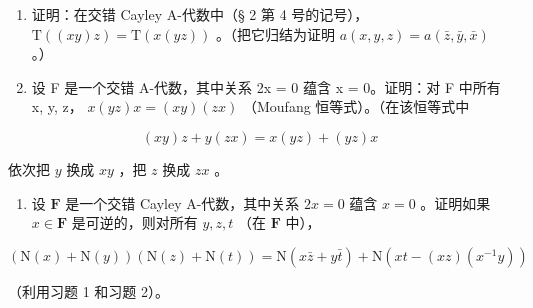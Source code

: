 \BourbakiAppendixExercises

\begin{enumerate}
\def\labelenumi{\arabic{enumi}.}
\item
  证明：在交错 Cayley A-代数中（§ 2 第 4 号的记号）， \(\mathrm{T}((xy)z) = \mathrm{T}(x(yz))\) 。（把它归结为证明 \(a(x,y,z) = a(\bar{z},\bar{y},\bar{x})\) 。）
\item
  设 F 是一个交错 A-代数，其中关系 2x = 0 蕴含 x = 0。证明：对 F 中所有 x, y, z， \(x(yz)x = (xy)(zx)\) （Moufang 恒等式）。（在该恒等式中
\end{enumerate}

\[
(x y) z + y (z x) = x (y z) + (y z) x
\]

依次把 \(y\) 换成 \(xy\) ，把 \(z\) 换成 \(zx\) 。

\begin{enumerate}
\def\labelenumi{\arabic{enumi}.}
\setcounter{enumi}{2}
\tightlist
\item
  设 \(\mathbf{F}\) 是一个交错 Cayley A-代数，其中关系 \(2x = 0\) 蕴含 \(x = 0\) 。证明如果 \(x \in \mathbf{F}\) 是可逆的，则对所有 \(y, z, t\) （在 \(\mathbf{F}\) 中），
\end{enumerate}

\[
(\mathrm{N} (x) + \mathrm{N} (y)) (\mathrm{N} (z) + \mathrm{N} (t)) = \mathrm{N} (x \bar {z} + y \bar {t}) + \mathrm{N} (x t - (x z) (x ^ {- 1} y))
\]

（利用习题 1 和习题 2）。
